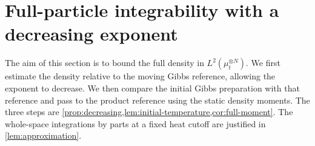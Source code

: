 \documentclass[11pt,reqno]{amsart}
\numberwithin{equation}{section}
\theoremstyle{plain}
\theoremstyle{remark}
\begin{document}
\par\endgroup

\begingroup

\section{Full-particle integrability with a decreasing exponent}\label{sec:decreasing}

The aim of this section is to bound the full density in $L^2(\mu_t^{\otimes N})$. We first estimate the density relative to the moving Gibbs reference, allowing the exponent to decrease. We then compare the initial Gibbs preparation with that reference and pass to the product reference using the static density moments. The three steps are \cref{prop:decreasing,lem:initial-temperature,cor:full-moment}. The whole-space integrations by parts at a fixed heat cutoff are justified in \cref{lem:approximation}.
\end{document}
